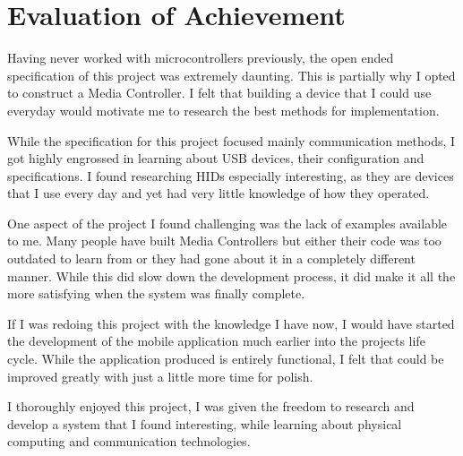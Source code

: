 \documentclass{article}
\begin{document}
	\section{Evaluation of Achievement}
		Having never worked with microcontrollers previously, the open ended specification of this project was extremely daunting. This is partially why I opted to construct a Media Controller. I felt that building a device that I could use everyday would motivate me to research the best methods for implementation. 
		
		While the specification for this project focused mainly communication methods, I got highly engrossed in learning about USB devices, their configuration and specifications. I found researching HIDs especially interesting, as they are devices that I use every day and yet had very little knowledge of how they operated. 
		
		One aspect of the project I found challenging was the lack of examples available to me. Many people have built Media Controllers but either their code was too outdated to learn from or they had gone about it in a completely different manner. While this did slow down the development process, it did make it all the more satisfying when the system was finally complete.
		
		If I was redoing this project with the knowledge I have now, I would have started the development of the mobile application much earlier into the projects life cycle. While the application produced is entirely functional, I felt that could be improved greatly with just a little more time for polish. 
		
		I thoroughly enjoyed this project, I was given the freedom to research and develop a system that I found interesting, while learning about physical computing and communication technologies.
					
	\newpage	
		
			
	
	
	

	\newpage
\end{document}

